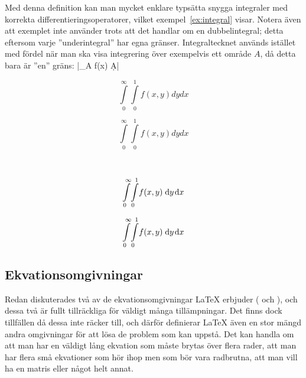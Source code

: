 \documentclass[../../a4.tex]{subfiles}
\begin{document}
Med denna definition kan man mycket enklare typsätta snygga integraler med
korrekta differentieringsoperatorer, vilket exempel~\vref{ex:integral}
visar. Notera även att exemplet inte använder  trots att det
handlar om en dubbelintegral; detta eftersom varje ”underintegral” har
egna gränser. Integraltecknet  används istället med fördel när
man ska visa integrering över exempelvis ett område \(A\), då detta bara
är ”en” gräns:
\latex|\iint_A\! f(x) \d{A}|

\begin{kod}[tbp]
	\centering
			\begin{minipage}[b]{0.225\textwidth}
				\[ \int\limits_0^\infty\int\limits_0^1 f(x,y) dydx \]
			\end{minipage}
			\begin{minipage}{0.625\textwidth}
				\begin{latexcode}
\begin{equation*}
\int\limits_0^\infty
\int\limits_0^1 f(x,y) dydx
\end{equation*}
				\end{latexcode}
			\end{minipage}
	\\
			\begin{minipage}[b]{0.225\textwidth}
				\[ \int\limits_0^\infty\!\int\limits_0^1\! f(x,y) \d{y}\d{x} \]
			\end{minipage}
			\begin{minipage}{0.625\textwidth}
				\begin{latexcode}
\begin{equation*}
\int\limits_0^\infty\!
\int\limits_0^1\! f(x,y) \d{y}\d{x}
\end{equation*}
				\end{latexcode}
			\end{minipage}
	\caption[Integral med korrekt och inkorrekt typsättning]{Integral med
	korrekt (underst) och inkorrekt (överst) typsättning. Notera att 
	 inte finns i \LaTeX{} från början utan måste definieras med 
	den kod som presenteras .}
	\label{ex:integral}
\end{kod}

\subsection{Ekvationsomgivningar}\label{sec:3:environments}
Redan  diskuterades två av de 
ekvationsomgivningar
\AmS\LaTeX{} erbjuder ( och ), och dessa två
är fullt tillräckliga för väldigt många tillämpningar. Det finns dock
tillfällen då dessa inte räcker till, och därför definierar \AmS\LaTeX{}
även en stor mängd andra omgivningar för att lösa de problem som kan 
uppstå. Det kan handla om att man har en väldigt lång ekvation som måste
brytas över flera rader, att man har flera små ekvationer som hör ihop men
som bör vara radbrutna, att man vill ha en matris eller något helt annat.
\end{document}
